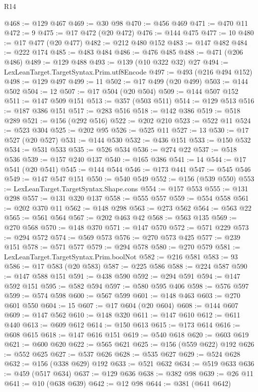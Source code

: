 \begin{lexlean}{R14}
\begin{coremodule}
@468 := @129 @467
@469 := @30 @98
@470 := @456 @469
@471 := @470 @11
@472 := 9
@475 := @17 @472 (@20 @472)
@476 := @144 @475
@477 := 10
@480 := @17 @477 (@20 @477)
@482 := @212 @480 @152
@483 := @147 @482
@484 := @222 @174
@485 := @483 @484
@486 := @476 @485
@488 := @471 (@206 @486)
@489 := @129 @488
@493 := @139 (@10 @322 @32) @27
@494 := LexLeanTarget.TargetSyntax.Prim.utf8Encode
@497 := @493 (@216 @494 @152)
@498 := @129 @497
@499 := 11
@502 := @17 @499 (@20 @499)
@503 := @144 @502
@504 := 12
@507 := @17 @504 (@20 @504)
@509 := @144 @507 @152
@511 := @147 @509 @151
@513 := @357 (@503 @511)
@514 := @129 @513
@516 := @187 @386 @151
@517 := @283 @516
@518 := @142 @386
@519 := @518 @289
@521 := @156 (@292 @516)
@522 := @202 @210
@523 := @522 @11
@524 := @523 @304
@525 := @202 @95
@526 := @525 @11
@527 := 13
@530 := @17 @527 (@20 @527)
@531 := @144 @530
@532 := @436 @151
@533 := @150 @532
@534 := @531 @533
@535 := @526 @534
@536 := @274 @22
@537 := @518 @536
@539 := @157 @240 @137
@540 := @165 @386
@541 := 14
@544 := @17 @541 (@20 @541)
@545 := @144 @544
@546 := @173 @441
@547 := @545 @546
@549 := @147 @547 @151
@550 := @540 @549
@552 := @156 (@539 @550)
@553 := LexLeanTarget.TargetSyntax.Shape.cons
@554 := @157 @553
@555 := @131 @298
@557 := @131 @320 @137
@558 := @555 @557
@559 := @554 @558
@561 := @202 @370 @11
@562 := @148 @298
@563 := @273 @562
@564 := @563 @22
@565 := @561 @564
@567 := @202 @463 @42
@568 := @563 @135
@569 := @270 @568
@570 := @148 @370
@571 := @147 @570
@572 := @571 @229
@573 := @294 @572
@574 := @569 @573
@576 := @270 @573 @425
@577 := @239 @151
@578 := @571 @577
@579 := @294 @578
@580 := @270 @579
@581 := LexLeanTarget.TargetSyntax.Prim.boolNot
@582 := @216 @581
@583 := 93
@586 := @17 @583 (@20 @583)
@587 := @225 @586
@588 := @224 @587
@590 := @147 @588 @151
@591 := @438 @590
@592 := @294 @591
@594 := @147 @592 @151
@595 := @582 @594
@597 := @580 @595 @406
@598 := @576 @597
@599 := @574 @598
@600 := @567 @599
@601 := @148 @463
@603 := @270 @601 @550
@604 := 15
@607 := @17 @604 (@20 @604)
@608 := @144 @607
@609 := @147 @562
@610 := @148 @320
@611 := @147 @610
@612 := @611 @440
@613 := @609 @612
@614 := @150 @613
@615 := @173 @614
@616 := @608 @615
@618 := @147 @616 @151
@619 := @540 @618
@620 := @603 @619
@621 := @600 @620
@622 := @565 @621
@625 := @156 (@559 @622) @192
@626 := @552 @625
@627 := @537 @626
@628 := @535 @627
@629 := @524 @628
@632 := @156 (@338 @629) @192
@633 := @521 @632
@634 := @519 @633
@636 := @459 (@517 @634)
@637 := @129 @636
@638 := @382 @98
@639 := @26 @11
@641 := @10 (@638 @639)
@642 := @12 @98
@644 := @381 (@641 @642)

\end{coremodule}
\end{lexlean}
